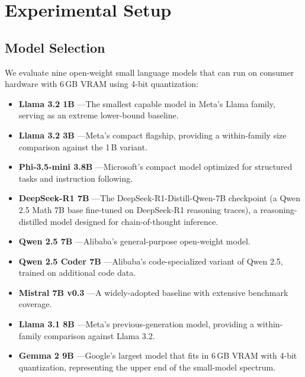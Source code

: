 
\section{Experimental Setup}

\subsection{Model Selection}

We evaluate nine open-weight small language models that can run on consumer hardware with 6\,GB VRAM using 4-bit quantization:

\begin{itemize}[nosep]
    \item \textbf{Llama 3.2 1B} \cite{meta2024llama3}---The smallest capable model in Meta's Llama family, serving as an extreme lower-bound baseline.
    \item \textbf{Llama 3.2 3B} \cite{meta2024llama3}---Meta's compact flagship, providing a within-family size comparison against the 1\,B variant.
    \item \textbf{Phi-3.5-mini 3.8B} \cite{phi2024}---Microsoft's compact model optimized for structured tasks and instruction following.
    \item \textbf{DeepSeek-R1 7B} \cite{deepseek2024r1}---The DeepSeek-R1-Distill-Qwen-7B checkpoint (a Qwen 2.5 Math 7B base fine-tuned on DeepSeek-R1 reasoning traces), a reasoning-distilled model designed for chain-of-thought inference.
    \item \textbf{Qwen 2.5 7B} \cite{qwen2024}---Alibaba's general-purpose open-weight model.
    \item \textbf{Qwen 2.5 Coder 7B} \cite{qwen2024, qwen2024coder}---Alibaba's code-specialized variant of Qwen 2.5, trained on additional code data.
    \item \textbf{Mistral 7B v0.3} \cite{jiang2023mistral}---A widely-adopted baseline with extensive benchmark coverage.
    \item \textbf{Llama 3.1 8B} \cite{meta2024llama3}---Meta's previous-generation model, providing a within-family comparison against Llama 3.2.
    \item \textbf{Gemma 2 9B} \cite{gemma2024b}---Google's largest model that fits in 6\,GB VRAM with 4-bit quantization, representing the upper end of the small-model spectrum.
\end{itemize}

